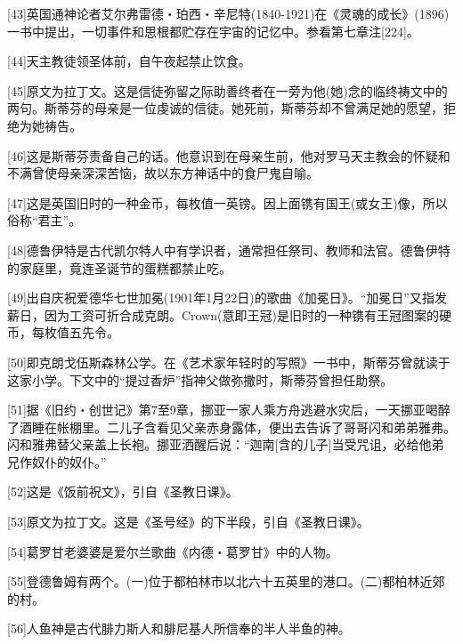 \documentclass{article}
\begin{document}
[43]英国通神论者艾尔弗雷德・珀西・辛尼特(1840-1921)在《灵魂的成长》(1896)一书中提出，一切事件和思根都贮存在宇宙的记忆中。参看第七章注[224]。



[44]天主教徒领圣体前，自午夜起禁止饮食。



[45]原文为拉丁文。这是信徒弥留之际助善终者在一旁为他(她)念的临终祷文中的两句。斯蒂芬的母亲是一位虔诚的信徒。她死前，斯蒂芬却不曾满足她的愿望，拒绝为她祷告。



[46]这是斯蒂芬责备自己的话。他意识到在母亲生前，他对罗马天主教会的怀疑和不满曾使母亲深深苦恼，故以东方神话中的食尸鬼自喻。



[47]这是英国旧时的一种金币，每枚值一英镑。因上面镌有国王(或女王)像，所以俗称“君主”。



[48]德鲁伊特是古代凯尔特人中有学识者，通常担任祭司、教师和法官。德鲁伊特的家庭里，竟连圣诞节的蛋糕都禁止吃。



[49]出自庆祝爱德华七世加冕(1901年1月22日)的歌曲《加冕日》。“加冕日”又指发薪日，因为工资可折合成克朗。Crown(意即王冠)是旧时的一种镌有王冠图案的硬币，每枚值五先令。



[50]即克朗戈伍斯森林公学。在《艺术家年轻时的写照》一书中，斯蒂芬曾就读于这家小学。下文中的“提过香炉”指神父做弥撒时，斯蒂芬曾担任助祭。



[51]据《旧约・创世记》第7至9章，挪亚一家人乘方舟逃避水灾后，一天挪亚喝醉了酒睡在帐棚里。二儿子含看见父亲赤身露体，便出去告诉了哥哥闪和弟弟雅弗。闪和雅弗替父亲盖上长袍。挪亚洒醒后说：“迦南[含的儿子]当受咒诅，必给他弟兄作奴仆的奴仆。”



[52]这是《饭前祝文》，引自《圣教日课》。



[53]原文为拉丁文。这是《圣号经》的下半段，引自《圣教日课》。



[54]葛罗甘老婆婆是爱尔兰歌曲《内德・葛罗甘》中的人物。



[55]登德鲁姆有两个。(一)位于都柏林市以北六十五英里的港口。(二)都柏林近郊的村。



[56]人鱼神是古代腓力斯人和腓尼基人所信奉的半人半鱼的神。
\end{document}
